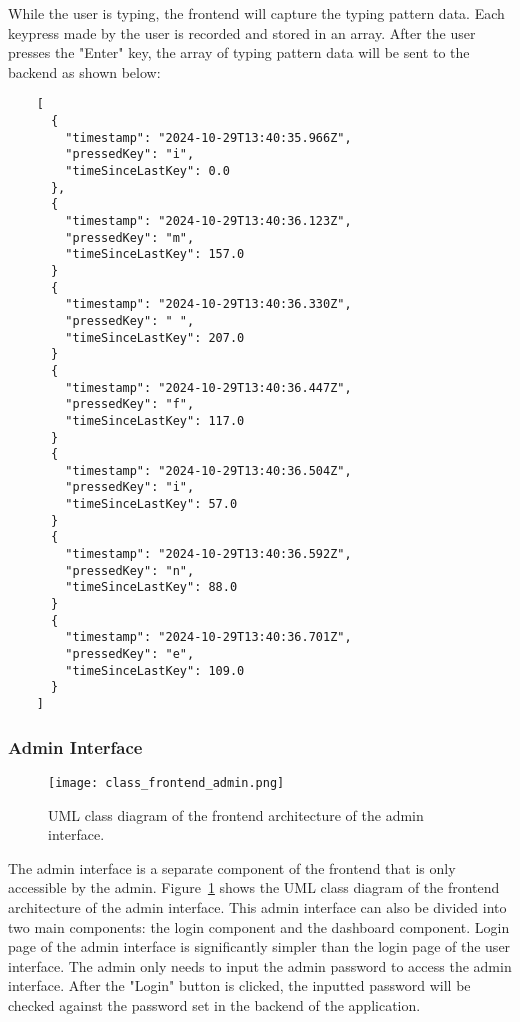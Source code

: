 While the user is typing, the frontend will capture the typing pattern data.
Each keypress made by the user is recorded and stored in an array.
After the user presses the "Enter" key, the array of typing pattern data will be sent to the backend as shown below:

\begin{verbatim}
    [
      {
        "timestamp": "2024-10-29T13:40:35.966Z", 
        "pressedKey": "i", 
        "timeSinceLastKey": 0.0
      },
      {
        "timestamp": "2024-10-29T13:40:36.123Z", 
        "pressedKey": "m", 
        "timeSinceLastKey": 157.0
      }
      {
        "timestamp": "2024-10-29T13:40:36.330Z", 
        "pressedKey": " ", 
        "timeSinceLastKey": 207.0
      }
      {
        "timestamp": "2024-10-29T13:40:36.447Z", 
        "pressedKey": "f", 
        "timeSinceLastKey": 117.0
      }
      {
        "timestamp": "2024-10-29T13:40:36.504Z", 
        "pressedKey": "i", 
        "timeSinceLastKey": 57.0
      }
      {
        "timestamp": "2024-10-29T13:40:36.592Z", 
        "pressedKey": "n", 
        "timeSinceLastKey": 88.0
      }
      {
        "timestamp": "2024-10-29T13:40:36.701Z", 
        "pressedKey": "e", 
        "timeSinceLastKey": 109.0
      }
    ]
    \end{verbatim}

\subsubsection{Admin Interface}

\begin{figure}[h!]
    \centering
    \texttt{[image: class\_frontend\_admin.png]}
    \caption{UML class diagram of the frontend architecture of the admin interface.}
    \label{class_frontend_admin}
\end{figure}

The admin interface is a separate component of the frontend that is only accessible by the admin.
Figure~\ref{class_frontend_admin} shows the UML class diagram of the frontend architecture of the admin interface.
This admin interface can also be divided into two main components: the login component and the dashboard component.
Login page of the admin interface is significantly simpler than the login page of the user interface.
The admin only needs to input the admin password to access the admin interface.
After the "Login" button is clicked, the inputted password will be checked against the password set in the backend of the application.


